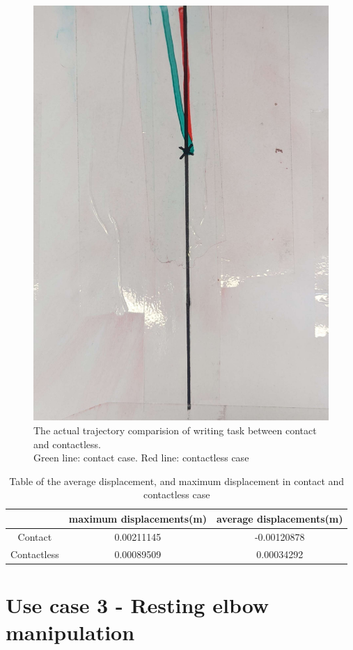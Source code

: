 \documentclass[report.tex]{subfiles}
\begin{document}
\begin{figure}[H]
    \captionsetup[figure]{justification=centering}
    \centering
    \includegraphics[width=0.5\linewidth]{images/us2_real_compare.jpg}
    \caption{The actual trajectory comparision of writing task between contact and contactless.\\Green line: contact case. Red line: contactless case}
    \label{fig:us2_traj_com_real}
\end{figure}
\begin{table}[H]
    \centering
    \begin{tabular}{c|c|c|}
    \cline{2-3}
                                      & maximum displacements(m) & average displacements(m) \\ \hline
    \multicolumn{1}{|c|}{Contact}     &  0.00211145              & -0.00120878               \\ \hline
    \multicolumn{1}{|c|}{Contactless} &  0.00089509              &  0.00034292              \\ \hline
    \end{tabular}%
    \caption{Table of the average displacement, and maximum displacement in contact and contactless case}
    \label{tab:us2_displacement}
    \end{table}

\newpage
\section{Use case 3 - Resting elbow manipulation}
\end{document}
